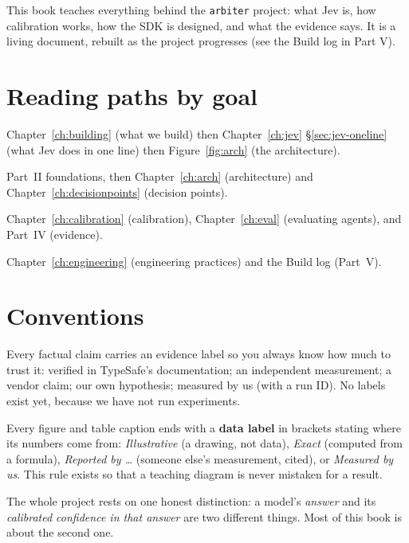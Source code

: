 This book teaches everything behind the \texttt{arbiter} project: what Jev is, how
calibration works, how the SDK is designed, and what the evidence says. It is a living
document, rebuilt as the project progresses (see the Build log in Part V).

\section*{Reading paths by goal}

\begin{description}[leftmargin=1.6cm,style=nextline]
  \item[\textcolor{clAccent}{10-minute tour}] Chapter~\ref{ch:building} (what we build) then
    Chapter~\ref{ch:jev} \S\ref{sec:jev-oneline} (what Jev does in one line) then
    Figure~\ref{fig:arch} (the architecture).
  \item[\textcolor{clAccent}{SDK user}] Part~II foundations, then Chapter~\ref{ch:arch}
    (architecture) and Chapter~\ref{ch:decisionpoints} (decision points).
  \item[\textcolor{clAccent}{Researcher}] Chapter~\ref{ch:calibration} (calibration),
    Chapter~\ref{ch:eval} (evaluating agents), and Part~IV (evidence).
  \item[\textcolor{clAccent}{Contributor}] Chapter~\ref{ch:engineering} (engineering
    practices) and the Build log (Part~V).
\end{description}

\section*{Conventions}

Every factual claim carries an evidence label so you always know how much to trust it:
\DOC{} verified in TypeSafe's documentation; \IND{} an independent measurement;
\VENDOR{} a vendor claim; \HYP{} our own hypothesis; \MEAS{} measured by us (with a run
ID). No \MEAS{} labels exist yet, because we have not run experiments.

Every figure and table caption ends with a \textbf{data label} in brackets stating where
its numbers come from: \emph{Illustrative} (a drawing, not data), \emph{Exact} (computed
from a formula), \emph{Reported by \dots} (someone else's measurement, cited), or
\emph{Measured by us}. This rule exists so that a teaching diagram is never mistaken for a
result.

\begin{keyidea}
The whole project rests on one honest distinction: a model's \emph{answer} and its
\emph{calibrated confidence in that answer} are two different things. Most of this book is
about the second one.
\end{keyidea}
